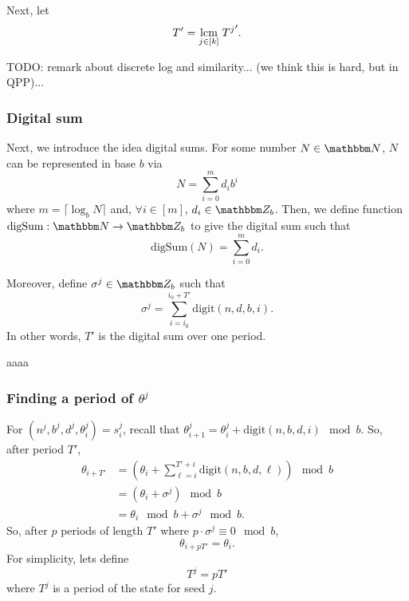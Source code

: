\documentclass[11pt,titlepage]{article}
\newcommand{\rationalPeriod}{{T^j}'}
\newcommand{\rationalPeriodTotal}{{T}'}
\newcommand{\seedAngle}[1]{{\theta^j_{#1}}}
\newcommand{\seedAngleNotime}{{\theta}^j}
\newcommand{\digSumPeriodic}{\sigma^j}
\begin{document}
Next, let $$
\rationalPeriodTotal = \lcm{j \in [k]}\; \rationalPeriod.
$$

\begin{remark}[Polytime]
  TODO: remark about discrete log and similarity... (we think this is hard, but in QPP)...
\end{remark}

\subsubsection{Digital sum}
Next, we introduce the idea digital sums.
For some number $N \in \N$, $N$ can be represented in base $b$ via
\begin{equation}
  N = \sum_{i=0}^{m} d_i b^i
\end{equation}
where $m = \lceil \log_b N \rceil$ and, $\forall i \in [m]$, $d_i \in \Z_b$.
Then, we define function $\mathrm{digSum}: \N \rightarrow \Z_b$
to give the digital sum such that
\begin{equation}
  \mathrm{digSum}(N) = \sum_{i=0}^{m} d_i.
\end{equation}

Moreover, define $\digSumPeriodic \in \Z_b$
such that
\begin{equation}
  \digSumPeriodic = \sum_{i = i_0}^{i_0 + \rationalPeriodTotal} \mathrm{digit}(n, d, b, i).
\end{equation}
In other words, $\rationalPeriodTotal$ is the digital sum over one period.

\begin{remark}
  aaaa
\end{remark}

\subsubsection{Finding a period of $\seedAngleNotime$} %
For $(n^j, b^j, d^j, \theta_i^j) = s_i^j$,
recall that $\seedAngle{i + 1} = \seedAngle{i} + \mathrm{digit}(n, b, d, i) \mod b$.
So, after period $\rationalPeriodTotal$,
\begin{align*}
  \theta_{i + \rationalPeriodTotal} &= \left(\theta_{i} + \sum_{\ell = i}^{\rationalPeriodTotal + i} \mathrm{digit}(n, b, d, \ell)\right) \mod b\\
  &= \left(\theta_{i} +  \digSumPeriodic\right) \mod b\\
  &= \theta_{i} \mod b +  \digSumPeriodic \mod b.
\end{align*}
So, after $p$ periods of length $\rationalPeriodTotal$ where $p  \cdot \digSumPeriodic \equiv 0 \mod b$,
$$
\theta_{i + p\rationalPeriodTotal} = \theta_i.
$$
For simplicity, lets define
$$
  T^j = p\rationalPeriodTotal
$$
where $T^j$ is a period of the state for seed $j$.
\end{document}
